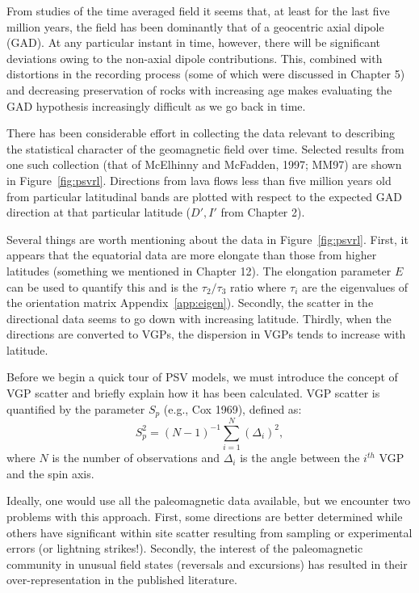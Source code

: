  From studies of the time averaged field  it seems that, at least for the last five million years, the field has been dominantly that of a geocentric axial dipole (GAD).    At any particular instant in time, however, there will be significant deviations owing to the non-axial dipole contributions.  This, combined with distortions in the recording process (some of which were discussed in Chapter  5) and decreasing preservation of rocks with increasing age makes evaluating the GAD hypothesis increasingly difficult as we go back in time.     
 
 
 
There has been considerable effort in collecting the data relevant to describing the statistical character of the geomagnetic field over time.  Selected results from one  such collection (that of McElhinny and McFadden, 1997; MM97) are shown in Figure~\ref{fig:psvrl}.  Directions from lava flows less than five million years old from particular latitudinal bands are plotted with respect to the expected GAD direction at that particular latitude ($D',I'$ from Chapter 2).     

Several things are worth mentioning about the data in Figure~\ref{fig:psvrl}.  First, it appears that the equatorial data are more elongate than those from higher latitudes (something we mentioned in Chapter  12).  The
elongation parameter $E$ can be used to quantify this and is the $\tau_2/\tau_3$ ratio where $\tau_i$ are the eigenvalues of the orientation matrix Appendix~\ref{app:eigen}).  Secondly, the scatter in the directional data seems to go down with increasing latitude.   Thirdly, when the directions are converted to VGPs, the dispersion in VGPs tends to increase with latitude.  

Before we begin a quick tour of PSV models, we must introduce the concept of
 VGP scatter and briefly explain how it has been calculated.   
VGP scatter is quantified  by the parameter $S_p$  (e.g., {{\it} Cox} 1969), defined   as:
\begin{equation}
S_p^2 = (N -1)^{-1} \sum_{i=1}^N (\Delta_i)^2,
\label{eq:Sp}
\end{equation}
\noindent where $N$ is the number of observations and $\Delta_i$ is the angle between the $i^{th}$ VGP and the spin axis.  

 Ideally, one would use all the paleomagnetic data available, but we encounter two problems with this approach. First, some directions are better determined while others have significant within site scatter resulting from sampling or experimental errors (or lightning strikes!).   Secondly, the interest of the paleomagnetic community in unusual field states (reversals and excursions) has resulted in their over-representation  in the published literature. 



